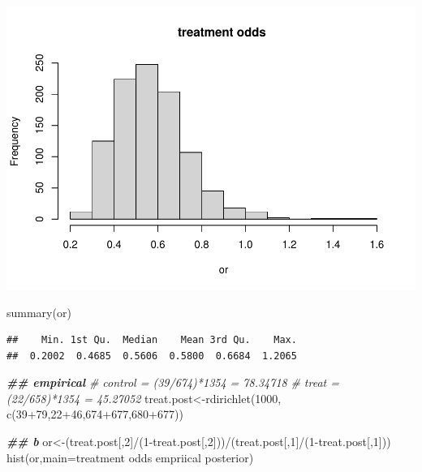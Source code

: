 \documentclass[
]{book}
\newenvironment{Shaded}{\begin{snugshade}}{\end{snugshade}}
\newcommand{\AttributeTok}[1]{\textcolor[rgb]{0.77,0.63,0.00}{#1}}
\newcommand{\CommentTok}[1]{\textcolor[rgb]{0.56,0.35,0.01}{\textit{#1}}}
\newcommand{\DecValTok}[1]{\textcolor[rgb]{0.00,0.00,0.81}{#1}}
\newcommand{\DocumentationTok}[1]{\textcolor[rgb]{0.56,0.35,0.01}{\textbf{\textit{#1}}}}
\newcommand{\FunctionTok}[1]{\textcolor[rgb]{0.00,0.00,0.00}{#1}}
\newcommand{\NormalTok}[1]{#1}
\newcommand{\OtherTok}[1]{\textcolor[rgb]{0.56,0.35,0.01}{#1}}
\newcommand{\SpecialCharTok}[1]{\textcolor[rgb]{0.00,0.00,0.00}{#1}}
\newcommand{\StringTok}[1]{\textcolor[rgb]{0.31,0.60,0.02}{#1}}
\theoremstyle{definition}
\theoremstyle{definition}
\theoremstyle{definition}
\theoremstyle{definition}
\theoremstyle{remark}
\begin{document}
\includegraphics{_main_files/figure-latex/unnamed-chunk-38-1.pdf}

\begin{Shaded}
\begin{Highlighting}[]
  \FunctionTok{summary}\NormalTok{(or)}
\end{Highlighting}
\end{Shaded}

\begin{verbatim}
##    Min. 1st Qu.  Median    Mean 3rd Qu.    Max. 
##  0.2002  0.4685  0.5606  0.5800  0.6684  1.2065
\end{verbatim}

\begin{Shaded}
\begin{Highlighting}[]
  \DocumentationTok{\#\# empirical}
  \CommentTok{\# control = (39/674)*1354 = 78.34718}
  \CommentTok{\# treat = (22/658)*1354 = 45.27052}
\NormalTok{  treat.post}\OtherTok{\textless{}{-}}\FunctionTok{rdirichlet}\NormalTok{(}\DecValTok{1000}\NormalTok{, }\FunctionTok{c}\NormalTok{(}\DecValTok{39}\SpecialCharTok{+}\DecValTok{79}\NormalTok{,}\DecValTok{22}\SpecialCharTok{+}\DecValTok{46}\NormalTok{,}\DecValTok{674}\SpecialCharTok{+}\DecValTok{677}\NormalTok{,}\DecValTok{680}\SpecialCharTok{+}\DecValTok{677}\NormalTok{))}
 
  
  \DocumentationTok{\#\# b}
\NormalTok{  or}\OtherTok{\textless{}{-}}\NormalTok{(treat.post[,}\DecValTok{2}\NormalTok{]}\SpecialCharTok{/}\NormalTok{(}\DecValTok{1}\SpecialCharTok{{-}}\NormalTok{treat.post[,}\DecValTok{2}\NormalTok{]))}\SpecialCharTok{/}\NormalTok{(treat.post[,}\DecValTok{1}\NormalTok{]}\SpecialCharTok{/}\NormalTok{(}\DecValTok{1}\SpecialCharTok{{-}}\NormalTok{treat.post[,}\DecValTok{1}\NormalTok{]))}
  \FunctionTok{hist}\NormalTok{(or,}\AttributeTok{main=}\StringTok{\textquotesingle{}treatment odds empriical posterior\textquotesingle{}}\NormalTok{)}
\end{Highlighting}
\end{Shaded}
\end{document}
